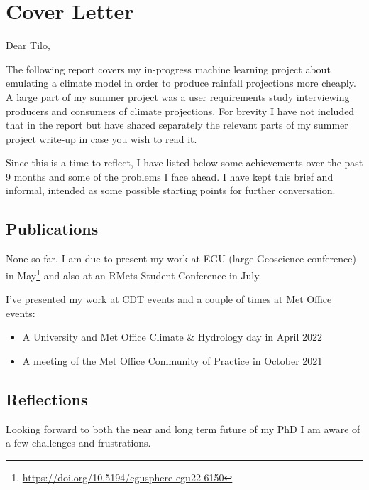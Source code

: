 \section*{Cover Letter}

Dear Tilo,

The following report covers my in-progress machine learning project about emulating a climate model in order to produce rainfall projections more cheaply. A large part of my summer project was a user requirements study interviewing producers and consumers of climate projections. For brevity I have not included that in the report but have shared separately the relevant parts of my summer project write-up in case you wish to read it.

Since this is a time to reflect, I have listed below some achievements over the past 9 months and some of the problems I face ahead. I have kept this brief and informal, intended as some possible starting points for further conversation.

\subsection*{Publications}
None so far. I am due to present my work at EGU (large Geoscience conference) in May\footnote{\url{https://doi.org/10.5194/egusphere-egu22-6150}} and also at an RMets Student Conference in July.

I've presented my work at CDT events and a couple of times at Met Office events:
\begin{itemize}
  \item A University and Met Office Climate \& Hydrology day in April 2022
  \item A meeting of the Met Office Community of Practice in October 2021
\end{itemize}

\subsection*{Reflections}

Looking forward to both the near and long term future of my PhD I am aware of a few challenges and frustrations.

